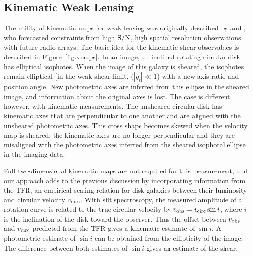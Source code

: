 \documentclass[12pt]{article}
\begin{document}
\subsection{Kinematic Weak Lensing}

The utility of kinematic maps for weak lensing was originally described by \citet{Blain2002} and \citet{Morales2006}, who forecasted constraints from high ${\rm S/N}$, high spatial resolution observations with future radio arrays. The basic idea for the kinematic shear observables is described in Figure~\ref{fig:vmaps}. In an image, an inclined rotating circular disk has elliptical isophotes. When the image of this galaxy is sheared, the isophotes remain elliptical (in the weak shear limit, ($|g_t|\ll1$) with a new axis ratio and position angle. New photometric axes are inferred from this ellipse in the sheared image, and information about the original axes is lost. The case is different however, with kinematic measurements. The unsheared circular disk has kinematic axes that are perpendicular to one another and are aligned with the unsheared photometric axes. This cross shape becomes skewed when the velocity map is sheared; the kinematic axes are no longer perpendicular and they are misaligned with the photometric axes inferred from the sheared isophotal ellipse in the imaging data.

Full two-dimensional kinematic maps are not required for this measurement, and our approach adds to the previous discussion by incorporating information from the TFR, an empirical scaling relation for disk galaxies between their luminosity and circular velocity $v_{\rm circ}$. With slit spectroscopy, the measured amplitude of a rotation curve is related to the true circular velocity by $v_{\rm obs} = v_{\rm circ} \sin i$, where $i$ is the inclination of the disk toward the observer. Thus the offset between $v_{\rm obs}$ and $v_{\rm circ}$ predicted from the TFR gives a kinematic estimate of $\sin i$. A photometric estimate of $\sin i$ can be obtained from the ellipticity of the image. The difference between both estimates of $\sin i$ gives an estimate of the shear.
\end{document}
